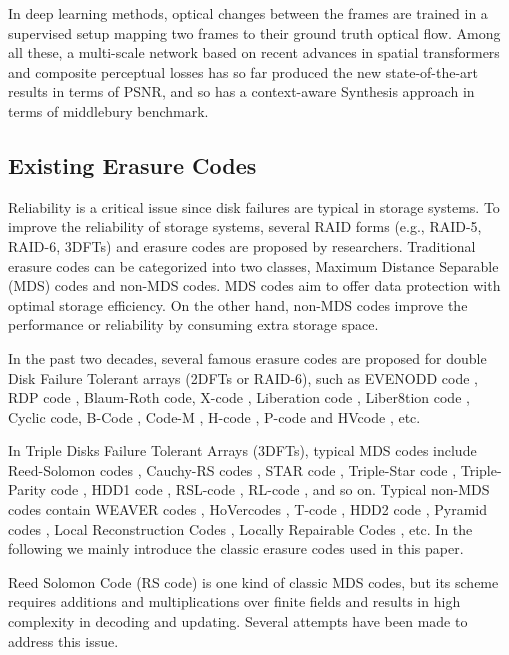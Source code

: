 \documentclass[sigconf]{acmart}
\begin{document}
In deep learning methods, optical changes between the frames are trained in a supervised setup mapping two frames to their ground truth optical flow. Among all these, a multi-scale network\cite{van2017frame} based on recent advances in spatial transformers and composite perceptual losses has so far produced the new state-of-the-art results in terms of PSNR, and so has a context-aware Synthesis approach\cite{niklaus2018context} in terms of middlebury benchmark.


\subsection{Existing Erasure Codes}\label{existEC}

Reliability is a critical issue since disk failures are typical in storage systems. To improve the reliability of storage systems, several RAID forms (e.g., RAID-5, RAID-6, 3DFTs) and erasure codes are proposed by researchers.  Traditional erasure codes can be categorized into two classes, Maximum Distance Separable (MDS) codes and non-MDS codes. MDS codes aim to offer data protection with optimal storage efficiency. On the other hand, non-MDS codes improve the performance or reliability by consuming extra storage space.

In the past two decades, several famous erasure codes are proposed for double Disk Failure Tolerant arrays (2DFTs or RAID-6), such as EVENODD code \cite{EVENODD}, RDP code \cite{RDP}, Blaum-Roth code\cite{BlaumRoth}, X-code \cite{XCode}, Liberation code \cite{Liberation}, Liber8tion code \cite{Liber8tion}, Cyclic \cite {Cyclic} code, B-Code \cite{BCode}, Code-M \cite{Code-M}, H-code \cite{hcode}, P-code \cite{PCode} and HVcode \cite{HVCode}, etc.

In Triple Disks Failure Tolerant Arrays (3DFTs), typical MDS codes include Reed-Solomon codes \cite{RS}, Cauchy-RS codes \cite{CRS}, STAR code \cite{STAR}, Triple-Star code \cite{TripleStar}, Triple-Parity code \cite{TPtech}, HDD1 code \cite{HDD}, RSL-code \cite{RSL}, RL-code \cite{RL}, and so on. Typical non-MDS codes contain WEAVER codes \cite{WEAVER}, HoVercodes \cite{HoVer}, T-code \cite{TCode}, HDD2 code \cite{HDD}, Pyramid codes \cite{Pyramid}, Local Reconstruction Codes \cite{LRC}, Locally Repairable Codes \cite{XORing}, etc.
In the following we mainly introduce the classic erasure codes used in this paper.

Reed Solomon Code \cite{RS} (RS code) is one kind of classic MDS codes, but its scheme requires additions and multiplications over finite fields and results in high complexity in decoding and updating. Several attempts have been made to address this issue.
\end{document}
